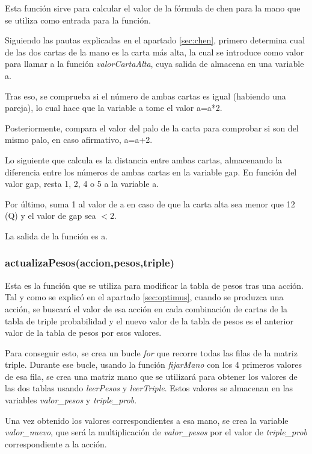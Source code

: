 Esta función sirve para calcular el valor de la fórmula de chen para la mano que se utiliza como entrada para la función.

Siguiendo las pautas explicadas en el apartado \ref{sec:chen}, primero determina cual de las dos cartas de la mano es la carta más alta, la cual se introduce como valor para llamar a la función \textit{valorCartaAlta}, cuya salida de almacena en una variable a. 

Tras eso, se comprueba si el número de ambas cartas es igual (habiendo una pareja), lo cual hace que la variable a tome el valor a=a*2.

Posteriormente, compara el valor del palo de la carta para comprobar si son del mismo palo, en caso afirmativo, a=a+2.

Lo siguiente que calcula es la distancia entre ambas cartas, almacenando la diferencia entre los números de ambas cartas en la variable gap. En función del valor gap, resta 1, 2, 4 o 5 a la variable a.

Por último, suma 1 al valor de a en caso de que la carta alta sea menor que 12 (Q) y el valor de gap sea $<2$.

La salida de la función es a.

\subsubsection{actualizaPesos(accion,pesos,triple)}

Esta es la función que se utiliza para modificar la tabla de pesos tras una acción. Tal y como se explicó en el apartado \ref{sec:optimus}, cuando se produzca una acción, se buscará el valor de esa acción en cada combinación de cartas de la tabla de triple probabilidad y el nuevo valor de la tabla de pesos es el anterior valor de la tabla de pesos por esos valores.

Para conseguir esto, se crea un bucle \textit{for} que recorre todas las filas de la matriz triple. Durante ese bucle, usando la función \textit{fijarMano} con los 4 primeros valores de esa fila, se crea una matriz mano que se utilizará para obtener los valores de las dos tablas usando \textit{leerPesos} y \textit{leerTriple}. Estos valores se almacenan en las variables \textit{valor\_pesos} y \textit{triple\_prob}.

Una vez obtenido los valores correspondientes a esa mano, se crea la variable \textit{valor\_nuevo}, que será la multiplicación de \textit{valor\_pesos} por el valor de \textit{triple\_prob} correspondiente a la acción. 

